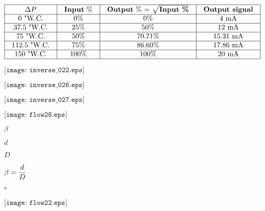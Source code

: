 \documentclass[12pt,a4paper,margin=2cm]{book}
\def\lthtmlcheckvsize{\ifdim\ht\sizebox<\vsize 
  \ifdim\wd\sizebox<\hsize\expandafter\hfill\fi \expandafter\vfill
  \else\expandafter\vss\fi}%
\begin{document}
{\newpage\clearpage
{}%
$\displaystyle \vbox{\offinterlineskip
\halign{\strut
\vrule \quad\hfil # \  \hfil & 
\vrule \quad\hfil # \  \hfil & 
\vrule \quad\hfil # \  \hfil & 
\vrule \quad\hfil # \  \hfil \vrule \cr
\noalign{\hrule }
$\Delta P$ & \textbf{Input} \% & \textbf{Output} \% = $\sqrt{\textbf{Input \%}}$ & \textbf{Output signal} \cr
\noalign{\hrule }
0 "W.C. & 0\% & 0\% & 4 mA \cr
\noalign{\hrule }
37.5 "W.C. & 25\% & 50\% & 12 mA \cr
\noalign{\hrule }
75 "W.C. & 50\% & 70.71\% & 15.31 mA \cr
\noalign{\hrule }
112.5 "W.C. & 75\% & 86.60\% & 17.86 mA \cr
\noalign{\hrule }
150 "W.C. & 100\% & 100\% & 20 mA \cr
\noalign{\hrule }
} %
}$%
\lthtmlindisplaymathZ
\lthtmlcheckvsize\clearpage}

{\newpage\clearpage
{}%
$\displaystyle \texttt{[image: inverse\_022.eps]}$%
\lthtmlindisplaymathZ
\lthtmlcheckvsize\clearpage}

{\newpage\clearpage
{}%
$\displaystyle \texttt{[image: inverse\_026.eps]}$%
\lthtmlindisplaymathZ
\lthtmlcheckvsize\clearpage}

{\newpage\clearpage
{}%
$\displaystyle \texttt{[image: inverse\_027.eps]}$%
\lthtmlindisplaymathZ
\lthtmlcheckvsize\clearpage}

{\newpage\clearpage
{}%
$\displaystyle \texttt{[image: flow28.eps]}$%
\lthtmlindisplaymathZ
\lthtmlcheckvsize\clearpage}

{\newpage\clearpage
{}%
$ \beta$%
\lthtmlindisplaymathZ
\lthtmlcheckvsize\clearpage}

{\newpage\clearpage
{}%
$ d$%
\lthtmlindisplaymathZ
\lthtmlcheckvsize\clearpage}

{\newpage\clearpage
{}%
$ D$%
\lthtmlindisplaymathZ
\lthtmlcheckvsize\clearpage}

{\newpage\clearpage
{}%
$\displaystyle \beta = {d \over D}$%
\lthtmlindisplaymathZ
\lthtmlcheckvsize\clearpage}

{\newpage\clearpage
{}%
$ ^{o}$%
\lthtmlindisplaymathZ
\lthtmlcheckvsize\clearpage}

{\newpage\clearpage
{}%
$\displaystyle \texttt{[image: flow22.eps]}$%
\lthtmlindisplaymathZ
\lthtmlcheckvsize\clearpage}
\end{document}
